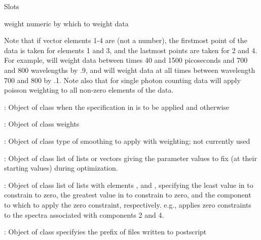 \begin{Section}{Slots}
{{\item[weight] numeric by which to weight data 
}
Note that if vector elements 1-4 are  (not a number), the firstmost 
point of the data is taken for elements 1 and 3, and the lastmost points
are taken for 2 and 4. 
For example,   will weight data between times 40 and 1500 
picoseconds and 700 and 800 wavelengths by .9, and will weight data at 
all times between wavelength 700 and 800 by .1.  
Note also that for single photon counting data 
 will apply poisson weighting to all 
non-zero elements of the data. 
\item[\code{weight}:] Object of class   when the specification in 
 is to be applied and  otherwise
\item[\code{weightM}:] Object of class  weights 
\item[\code{weightsmooth}:] Object of class  type of smoothing to apply with weighting; not currently
used
\item[\code{fixed}:] Object of class  list of lists or vectors giving the parameter values 
to fix (at their starting values) during optimization. 
\item[\code{clp0}:] Object of class   list of lists with elements ,  and 
, specifying the least value in   to constrain 
to zero, the greatest value in   to 
constrain to zero, and the component to which to apply the zero constraint, 
respectively.  e.g.,  applies zero constraints to the spectra 
associated with components 2 and 4. 
\item[\code{makeps}:] Object of class  
specifyies the prefix of files written to 
postscript

}
\end{Section}
